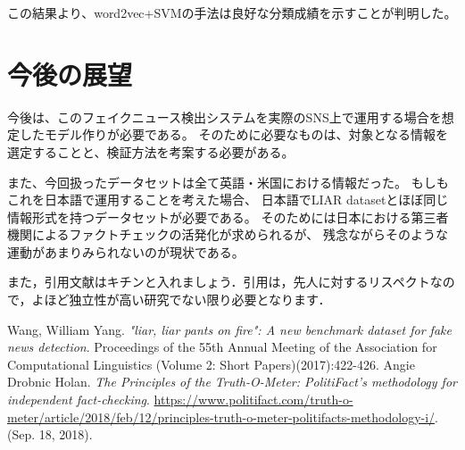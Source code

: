 \documentclass[twocolumn, a4paper, uplatex]{UECIEresume}
\begin{document}
この結果より、word2vec+SVMの手法は良好な分類成績を示すことが判明した。

\section{今後の展望}
今後は、このフェイクニュース検出システムを実際のSNS上で運用する場合を想定したモデル作りが必要である。
そのために必要なものは、対象となる情報を選定することと、検証方法を考案する必要がある。

また、今回扱ったデータセットは全て英語・米国における情報だった。
もしもこれを日本語で運用することを考えた場合、
日本語でLIAR datasetとほぼ同じ情報形式を持つデータセットが必要である。
そのためには日本における第三者機関によるファクトチェックの活発化が求められるが、
残念ながらそのような運動があまりみられないのが現状である。

また，引用文献はキチンと入れましょう\cite{Kinoshita1}．引用は，先人に対するリスペクトなので，よほど独立性が高い研究でない限り必要となります．

{\small
\begin{thebibliography}{*}
  Wang, William Yang. \textit{"liar, liar pants on fire": A new benchmark dataset for fake news detection}. Proceedings of the 55th Annual Meeting of the Association for Computational Linguistics (Volume 2: Short Papers)(2017):422-426.
  Angie Drobnic Holan. \textit{The Principles of the Truth-O-Meter: PolitiFact’s methodology for independent fact-checking}. \url{https://www.politifact.com/truth-o-meter/article/2018/feb/12/principles-truth-o-meter-politifacts-methodology-i/}. (Sep. 18, 2018).
\end{thebibliography}
}
\end{document}
